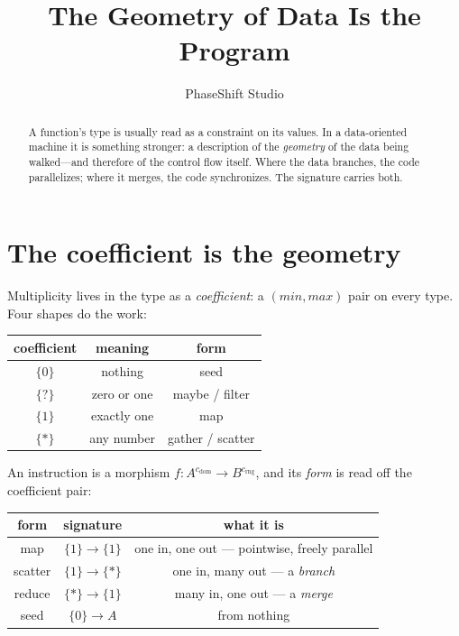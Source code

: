 \documentclass[11pt]{article}
\title{The Geometry of Data Is the Program}
\author{PhaseShift Studio}
\date{}
\begin{document}
\maketitle

\begin{abstract}
A function's type is usually read as a constraint on its values. In a
data-oriented machine it is something stronger: a description of the
\emph{geometry} of the data being walked---and therefore of the control flow
itself. Where the data branches, the code parallelizes; where it merges, the
code synchronizes. The signature carries both.
\end{abstract}

\section{The coefficient is the geometry}

Multiplicity lives in the type as a \emph{coefficient}: a $(min, max)$ pair on
every type. Four shapes do the work:

\begin{center}
\begin{tabular}{@{}ccc@{}}
\toprule
coefficient & meaning & form \\
\midrule
$\{0\}$ & nothing      & seed \\
$\{?\}$ & zero or one  & maybe / filter \\
$\{1\}$ & exactly one  & map \\
$\{*\}$ & any number   & gather / scatter \\
\bottomrule
\end{tabular}
\end{center}

An instruction is a morphism $f : A^{c_{\mathrm{dom}}} \to B^{c_{\mathrm{rng}}}$,
and its \emph{form} is read off the coefficient pair:

\begin{center}
\begin{tabular}{@{}ccc@{}}
\toprule
form    & signature        & what it is \\
\midrule
map     & $\{1\} \to \{1\}$ & one in, one out --- pointwise, freely parallel \\
scatter & $\{1\} \to \{*\}$ & one in, many out --- a \emph{branch} \\
reduce  & $\{*\} \to \{1\}$ & many in, one out --- a \emph{merge} \\
seed    & $\{0\} \to A$     & from nothing \\
\bottomrule
\end{tabular}
\end{center}
\end{document}

